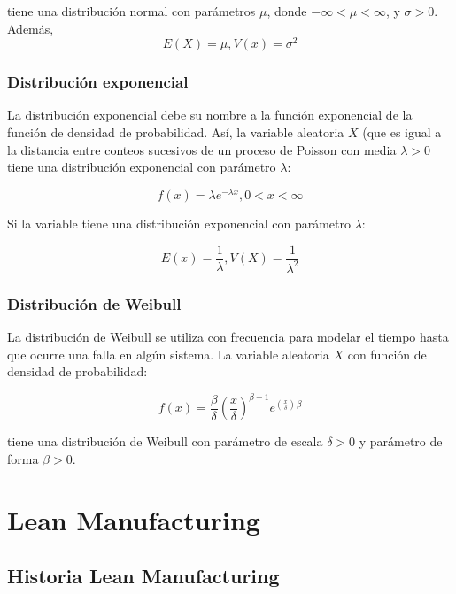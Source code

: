 tiene una distribución normal con parámetros $\mu$, donde $-\infty<\mu<\infty$, y $\sigma>0$.\\

Además,
\begin{equation*}
E(X)=\mu , V(x)=\sigma^2
\end{equation*}

\subsubsection{Distribución exponencial}

La distribución exponencial debe su nombre a la función exponencial de la función de densidad de probabilidad. Así, la variable aleatoria $X$ (que es igual a la distancia entre conteos sucesivos de un proceso de Poisson con media $\lambda>0$ tiene una distribución exponencial con parámetro $\lambda$:

\begin{equation*}
f(x)=\lambda e^{-\lambda x}, 0<x<\infty
\end{equation*}

Si la variable tiene una distribución exponencial con parámetro $\lambda$:

\begin{equation*}
E(x)=\frac{1}{\lambda}, V(X)=\frac{1}{\lambda^2}
\end{equation*}

\subsubsection{Distribución de Weibull}

La distribución de Weibull se utiliza con frecuencia para modelar el tiempo hasta que ocurre una falla en algún sistema. La variable aleatoria $X$ con función de densidad de probabilidad:

\begin{equation*}
f(x)=\frac{\beta}{\delta}\left( \frac{x}{\delta} \right)^{\beta-1}e^{\left( \frac{x}{\delta} \right)}{}^\beta
\end{equation*}

tiene una distribución de Weibull con parámetro de escala $\delta>0$ y parámetro de forma $\beta>0$.


\section{Lean Manufacturing}

\subsection{Historia Lean Manufacturing}

